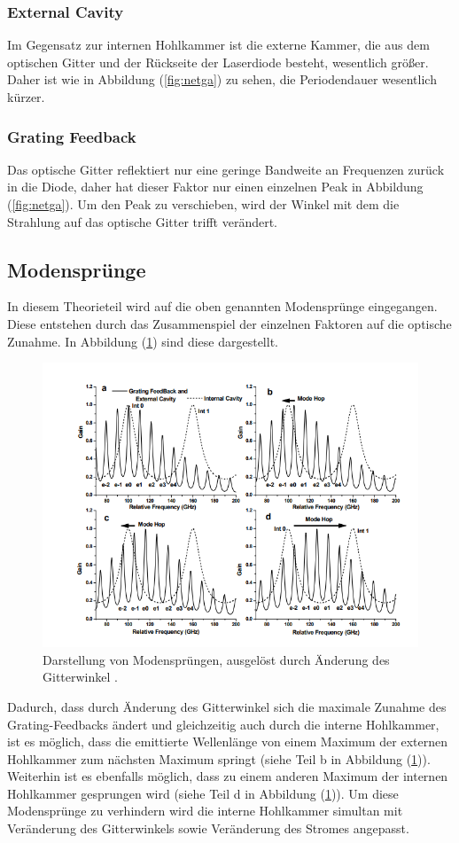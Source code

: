 \subsubsection{External Cavity}
Im Gegensatz zur internen Hohlkammer ist die externe Kammer, die aus dem optischen Gitter und der Rückseite der Laserdiode besteht, wesentlich größer. Daher ist wie in Abbildung (\ref{fig:netga}) zu sehen, die Periodendauer wesentlich kürzer.
\subsubsection{Grating Feedback}
Das optische Gitter reflektiert nur eine geringe Bandweite an Frequenzen zurück in die Diode, daher hat dieser Faktor nur einen einzelnen Peak in Abbildung (\ref{fig:netga}). Um den Peak zu verschieben,
wird der Winkel mit dem die Strahlung auf das optische Gitter trifft verändert.
\subsection{Modensprünge}
In diesem Theorieteil wird auf die oben genannten Modensprünge eingegangen. Diese entstehen durch das Zusammenspiel der einzelnen Faktoren auf die optische Zunahme. In Abbildung (\ref{fig:mode}) sind
diese dargestellt.
\begin{figure}[h!]
  \centering
  \includegraphics[scale=0.5]{fig/mode.png}
  \caption{Darstellung von Modensprüngen, ausgelöst durch Änderung des Gitterwinkel \cite[10]{Anleitung}.}
  \label{fig:mode}
\end{figure}
\FloatBarrier
\noindent Dadurch, dass durch Änderung des Gitterwinkel sich die maximale Zunahme des Grating-Feedbacks ändert und gleichzeitig auch durch die interne Hohlkammer, ist es möglich, dass die
emittierte Wellenlänge von einem Maximum der externen Hohlkammer zum nächsten Maximum springt (siehe Teil b in Abbildung (\ref{fig:mode})). Weiterhin ist es ebenfalls möglich, dass zu einem anderen Maximum der internen
Hohlkammer gesprungen wird (siehe Teil d in Abbildung (\ref{fig:mode})). Um diese Modensprünge zu verhindern wird die interne Hohlkammer simultan mit Veränderung des Gitterwinkels sowie Veränderung des Stromes angepasst.
